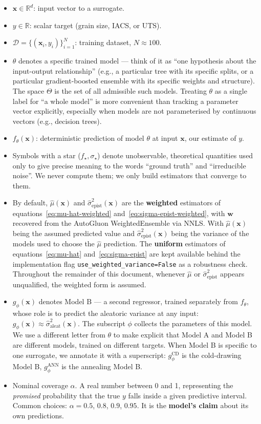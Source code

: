 \documentclass[11pt,a4paper]{article}
\begin{document}
\begin{itemize}
    \item $\bm x \in \mathbb{R}^d$: input vector to a surrogate.
    \item $y \in \mathbb{R}$: scalar target (grain size, IACS, or UTS).
    \item $\mathcal{D} = \{(\bm x_i, y_i)\}_{i=1}^N$: training dataset, $N \approx 100$.
    \item $\theta$ denotes a specific trained model --- think of it as ``one hypothesis about the input-output relationship'' (e.g., a particular tree with its specific splits, or a particular gradient-boosted ensemble with its specific weights and structure). The space $\Theta$ is the set of all admissible such models. Treating $\theta$ as a single label for ``a whole model'' is more convenient than tracking a parameter vector explicitly, especially when models are not parameterised by continuous vectors (e.g., decision trees).
    \item $f_\theta(\bm x)$: deterministic prediction of model $\theta$ at input $\bm x$, our estimate of $y$.
    \item Symbols with a star ($f_\star, \sigma_\star$) denote unobservable, theoretical quantities used only to give precise meaning to the words ``ground truth'' and ``irreducible noise''. We never compute them; we only build estimators that converge to them.
    \item By default, $\hat\mu(\bm x)$ and $\hat\sigma^2_{\text{epist}}(\bm x)$ are the \textbf{weighted} estimators of equations~\eqref{eq:mu-hat-weighted} and~\eqref{eq:sigma-epist-weighted}, with $\bm w$ recovered from the AutoGluon WeightedEnsemble via NNLS. With $\hat\mu(\bm x)$ being the assumed predicted value and $\hat\sigma^2_{\text{epist}}(\bm x)$ being the variance of the models used to choose the $\hat\mu$ prediction. The \textbf{uniform} estimators of equations~\eqref{eq:mu-hat} and~\eqref{eq:sigma-epist} are kept available behind the implementation flag \texttt{use\_weighted\_variance=False} as a robustness check. Throughout the remainder of this document, whenever $\hat\mu$ or $\hat\sigma^2_{\text{epist}}$ appears unqualified, the weighted form is assumed.
    \item $g_\phi(\bm x)$ denotes Model B — a second regressor, trained separately from $f_\theta$, whose role is to predict the aleatoric variance at any input: $g_\phi(\bm x) \approx \hat\sigma^2_{\text{aleat}}(\bm x)$. The subscript $\phi$ collects the parameters of this model. We use a different letter from $\theta$ to make explicit that Model A and Model B are different models, trained on different targets. When Model B is specific to one surrogate, we annotate it with a superscript: $g_\phi^{\text{CD}}$ is the cold-drawing Model B, $g_\phi^{\text{ANN}}$ is the annealing Model B.
    \item Nominal coverage $\alpha$. A real number between 0 and 1, representing the \emph{promised} probability that the true $y$ falls inside a given predictive interval. Common choices: $\alpha = 0.5$, $0.8$, $0.9$, $0.95$. It is the \textbf{model's claim} about its own predictions.
\end{itemize}
\end{document}
